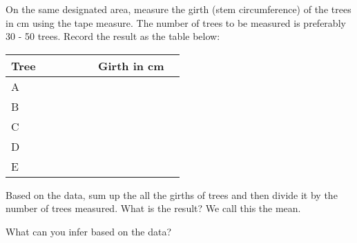 \begin{myenumerate}
\item On the same designated area, measure the girth (stem circumference) of the trees in cm using
the tape measure. The number of trees to be measured is preferably 30 - 50 trees.
Record the result as the table below:

\begin{center}
\begin{tabular}{|>{\centering\arraybackslash}p{0.25\linewidth}|>{\centering\arraybackslash}p{0.25\linewidth}|}
\hline
Tree & Girth in cm\\
\hline
A & \\ \hline
B & \\ \hline
C & \\ \hline
D & \\ \hline
E & \\ \hline
\end{tabular}
\end{center}

Based on the data, sum up the all the girths of trees and then divide it by the number of trees
measured. What is the result? We call this the mean.

What can you infer based on the data?

\end{myenumerate}